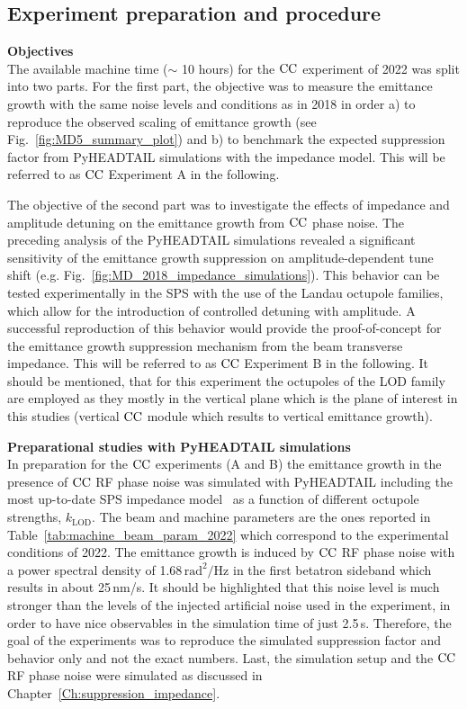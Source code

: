 \subsection{Experiment preparation and procedure}\label{sec:cc_md_2022_preparation}
\textbf{Objectives}\\
The available machine time ($\sim$ 10 hours) for the ${\mathrm{CC}}$ experiment of 2022 was split into two parts. For the first part, the objective was to measure the emittance growth with the same noise levels and conditions as in 2018 in order a) to reproduce the observed scaling of emittance growth (see Fig.~\ref{fig:MD5_summary_plot}) and b) to benchmark the expected suppression factor from PyHEADTAIL simulations with the impedance model. This will be referred to as ${\mathrm{CC}}$ Experiment A in the following.

The objective of the second part was to investigate the effects of impedance and amplitude detuning on the emittance growth from ${\mathrm{CC}}$ phase noise. The preceding analysis of the PyHEADTAIL simulations revealed a significant sensitivity of the emittance growth suppression on amplitude-dependent tune shift (e.g. Fig.~\ref{fig:MD_2018_impedance_simulations}). This behavior can be tested experimentally in the SPS with the use of the Landau octupole families, which allow for the introduction of controlled detuning with amplitude. A successful reproduction of this behavior would provide the proof-of-concept for the emittance growth suppression mechanism from the beam transverse impedance. This will be referred to as ${\mathrm{CC}}$ Experiment B in the following. It should be mentioned, that for this experiment the octupoles of the LOD family are employed as they mostly in the vertical plane which is the plane of interest in this studies (vertical ${\mathrm{CC}}$ module which results to vertical emittance growth).

\textbf{Preparational studies with PyHEADTAIL simulations}\\
In preparation for the ${\mathrm{CC}}$ experiments (A and B) the emittance growth in the presence of ${\mathrm{CC}}$ RF phase noise was simulated with PyHEADTAIL including the most up-to-date SPS impedance model~\cite{updated_sps_wakfields_model} as a function of different octupole strengths, $k_{\mathrm{LOD}}$. The beam and machine parameters are the ones reported in Table~\ref{tab:machine_beam_param_2022} which correspond to the experimental conditions of 2022. The emittance growth is induced by ${\mathrm{CC}}$ RF phase noise with a power spectral density of 1.68\,$\mathrm{rad^2/Hz}$ in the first betatron sideband which results in about 25\,nm/s. It should be highlighted that this noise level is much stronger than the levels of the injected artificial noise used in the experiment, in order to have nice observables in the simulation time of just 2.5\,s. Therefore, the goal of the experiments was to reproduce the simulated suppression factor and behavior only and not the exact numbers. Last, the simulation setup and the ${\mathrm{CC}}$ RF phase noise were simulated as discussed in Chapter~\ref{Ch:suppression_impedance}. 


